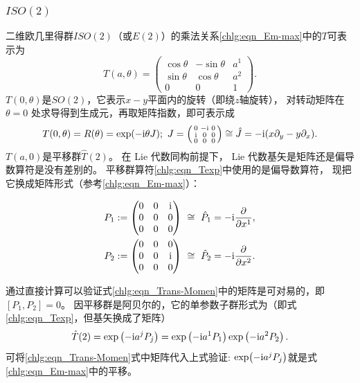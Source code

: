 \subsubsection{\texorpdfstring{$ISO(2)$}{ISO(2)}}\label{chlg:sec_e2}
二维欧几里得群$ISO(2)$（或$E(2)$）的乘法关系\eqref{chlg:eqn_Em-max}中的$T$可表示为
\begin{equation}
    T( a, \theta ) =  \begin{pmatrix}
        {\cos \theta }&{ - \sin \theta }& a^1 \\
        {\sin \theta }&{\cos \theta }& a^2 \\
        0&0&1
    \end{pmatrix} .
\end{equation}
$T( 0, \theta )$是$SO(2)$，它表示$x-y$平面内的旋转（即绕$z$轴旋转），
对转动矩阵在 $\theta=0$ 处求导得到生成元，再取矩阵指数，即可表示成
\begin{equation}\label{chlg:eqn_tmpR}
    T( 0, \theta )= R(\theta ) =\exp(-\mathrm{i} \theta J); \
    J = \left(\begin{smallmatrix}
        0 & -\mathrm{i} & 0 \\
        \mathrm{i} & 0 & 0 \\
        0 & 0 & 0
    \end{smallmatrix} \right)\cong
    \hat{J} = -\mathrm{i} (x \partial_y - y \partial_x ).
\end{equation}
$T( a, 0 )$是平移群$\hat{T}(2)$。
在 Lie 代数同构前提下， Lie 代数基矢是矩阵还是偏导数算符是没有差别的。
平移群算符\eqref{chlg:eqn_Texp}中使用的是偏导数算符，
现把它换成矩阵形式（参考\eqref{chlg:eqn_Em-max}）：
\begin{small}
\begin{equation}\label{chlg:eqn_Trans-Momen}
\begin{aligned}
    P_1:=\begin{pmatrix}
        0 & 0 & \mathrm{i} \\
        0 & 0 & 0 \\
        0 & 0 & 0
    \end{pmatrix}\ \cong\ \hat{P}_1=-\mathrm{i} \frac{\partial}{\partial x^1},\\
    P_2:=\begin{pmatrix}
        0 & 0 & 0 \\
        0 & 0 & \mathrm{i} \\
        0 & 0 & 0
    \end{pmatrix}\ \cong\ \hat{P}_2=-\mathrm{i} \frac{\partial}{\partial x^2}.
\end{aligned}
\end{equation}
\end{small}
通过直接计算可以验证式\eqref{chlg:eqn_Trans-Momen}中的矩阵是可对易的，即$[P_1,P_2]=0$。
因平移群是阿贝尔的，它的单参数子群形式为（即式\eqref{chlg:eqn_Texp}，但基矢换成了矩阵）
\begin{equation}
    \hat{T}(2) = \exp\left( -\mathrm{i} a^j P_j \right)
    = \exp\left(-\mathrm{i} a^1 P_1  \right)  \exp\left(-\mathrm{i} a^2 P_2 \right)  .
\end{equation}
可将\eqref{chlg:eqn_Trans-Momen}式中矩阵代入上式验证:
$\exp(-\mathrm{i} a^j P_j)$就是式\eqref{chlg:eqn_Em-max}中的平移。

